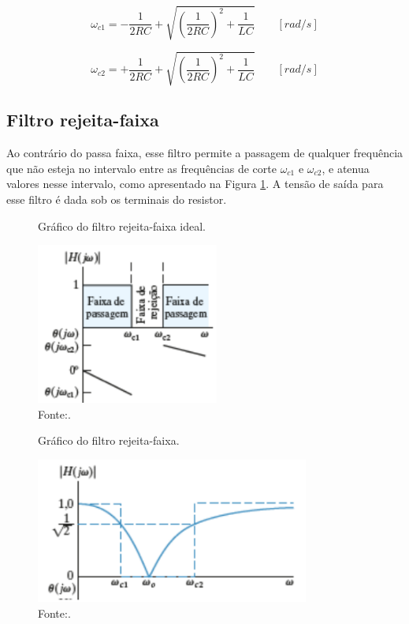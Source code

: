 \begin{equation}
	\omega_{c1} = - \frac{1}{2RC} + \sqrt{ (\frac{1}{2RC})^2 + \frac{1}{LC} } \qquad [rad/s]
	\label{omegaC1}
\end{equation}

\begin{equation}
	\omega_{c2} = + \frac{1}{2RC} + \sqrt{ (\frac{1}{2RC})^2 + \frac{1}{LC} } \qquad [rad/s]
	\label{omegaC2}
\end{equation}

\pagebreak

\subsection{Filtro rejeita-faixa}

Ao contrário do passa faixa, esse filtro permite a passagem de qualquer frequência que não esteja no intervalo entre as frequências de corte $\omega_{c1}$ e $\omega_{c2}$, e atenua valores nesse intervalo, como apresentado na Figura \ref{graficoRejeitaFaixaIdeal}. A tensão de saída para esse filtro é dada sob os terminais do resistor.

\begin{figure}[ht]
	\centering
	\caption{Gráfico do filtro rejeita-faixa ideal.}
	\includegraphics[width=6cm]{imagens/graficoRejeitaFaixaIdeal.png}
	\caption*{Fonte:\cite{nilsson2008circuitos}.}
	\label{graficoRejeitaFaixaIdeal}
\end{figure}

\begin{figure}[ht]
	\centering
	\caption{Gráfico do filtro rejeita-faixa.}
	\includegraphics[width=9cm]{imagens/graficoFiltroRejeitaFaixa.png}
	\caption*{Fonte:\cite{nilsson2008circuitos}.}
\end{figure}

